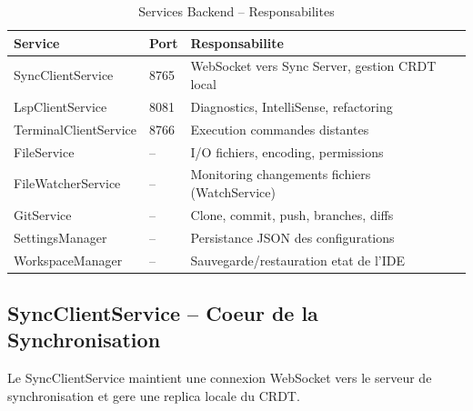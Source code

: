 \documentclass[11pt,a4paper,hidelinks]{book}
\begin{document}
\begin{table}[H]
\centering
\caption{Services Backend -- Responsabilites}
\begin{tabularx}{\textwidth}{l l X}
\toprule
\textbf{Service} & \textbf{Port} & \textbf{Responsabilite} \\
\midrule
SyncClientService & 8765 & WebSocket vers Sync Server, gestion CRDT local \\
LspClientService & 8081 & Diagnostics, IntelliSense, refactoring \\
TerminalClientService & 8766 & Execution commandes distantes \\
FileService & -- & I/O fichiers, encoding, permissions \\
FileWatcherService & -- & Monitoring changements fichiers (WatchService) \\
GitService & -- & Clone, commit, push, branches, diffs \\
SettingsManager & -- & Persistance JSON des configurations \\
WorkspaceManager & -- & Sauvegarde/restauration etat de l'IDE \\
\bottomrule
\end{tabularx}
\end{table}

\subsection{SyncClientService -- Coeur de la Synchronisation}

Le SyncClientService maintient une connexion WebSocket vers le serveur de synchronisation et gere une replica locale du CRDT.
\end{document}
